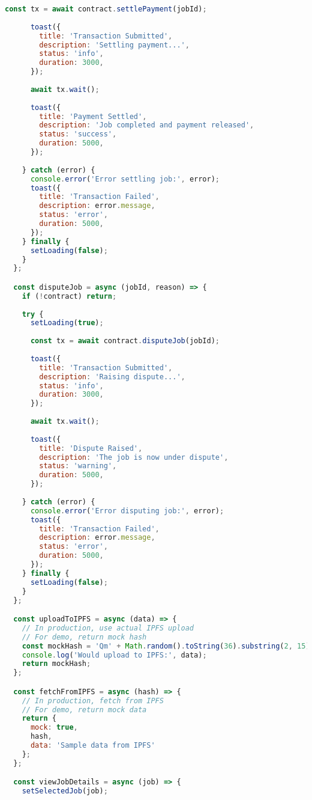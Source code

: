 \begin{lstlisting}[language=JavaScript,caption={App.jsx - Main React Application}]
      const tx = await contract.settlePayment(jobId);
      
      toast({
        title: 'Transaction Submitted',
        description: 'Settling payment...',
        status: 'info',
        duration: 3000,
      });
      
      await tx.wait();
      
      toast({
        title: 'Payment Settled',
        description: 'Job completed and payment released',
        status: 'success',
        duration: 5000,
      });
      
    } catch (error) {
      console.error('Error settling job:', error);
      toast({
        title: 'Transaction Failed',
        description: error.message,
        status: 'error',
        duration: 5000,
      });
    } finally {
      setLoading(false);
    }
  };

  const disputeJob = async (jobId, reason) => {
    if (!contract) return;
    
    try {
      setLoading(true);
      
      const tx = await contract.disputeJob(jobId);
      
      toast({
        title: 'Transaction Submitted',
        description: 'Raising dispute...',
        status: 'info',
        duration: 3000,
      });
      
      await tx.wait();
      
      toast({
        title: 'Dispute Raised',
        description: 'The job is now under dispute',
        status: 'warning',
        duration: 5000,
      });
      
    } catch (error) {
      console.error('Error disputing job:', error);
      toast({
        title: 'Transaction Failed',
        description: error.message,
        status: 'error',
        duration: 5000,
      });
    } finally {
      setLoading(false);
    }
  };

  const uploadToIPFS = async (data) => {
    // In production, use actual IPFS upload
    // For demo, return mock hash
    const mockHash = 'Qm' + Math.random().toString(36).substring(2, 15);
    console.log('Would upload to IPFS:', data);
    return mockHash;
  };

  const fetchFromIPFS = async (hash) => {
    // In production, fetch from IPFS
    // For demo, return mock data
    return {
      mock: true,
      hash,
      data: 'Sample data from IPFS'
    };
  };

  const viewJobDetails = async (job) => {
    setSelectedJob(job);
    

\end{lstlisting}
